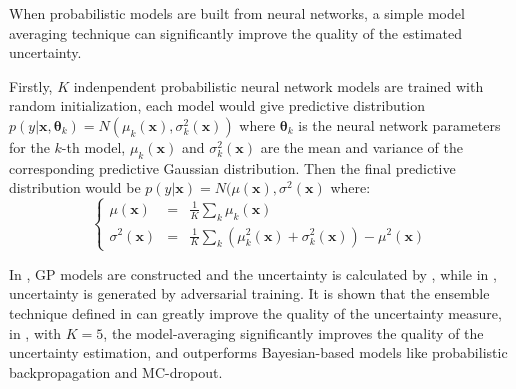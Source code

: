 When probabilistic models are built from neural networks, a simple model averaging technique\cite{lazaro2010marginalized, huang2015scalable, lakshminarayanan2017simple} can significantly improve the quality of the estimated uncertainty. 

Firstly, $K$ indenpendent probabilistic neural network models are trained with random initialization, each model would give predictive distribution $p(y | \bm{x}, \bm{\theta}_k) = N(\mu_k(\bm{x}), \sigma_k^2(\bm{x}))$ where $\bm{\theta}_k$ is the neural network parameters for the $k$-th model, $\mu_k(\bm{x})$ and $\sigma_k^2(\bm{x})$ are the mean and variance of the corresponding predictive Gaussian distribution. Then the final predictive distribution would be $p(y | \bm{x}) = N(\mu(\bm{x}), \sigma^2(\bm{x})$ where:
\begin{equation}
    \left\{
        \begin{array}{lll}
            \mu(\bm{x})      &=& \frac{1}{K} \sum_k \mu_k(\bm{x}) \\
            \sigma^2(\bm{x}) &=& \frac{1}{K} \sum_k (\mu_k^2(\bm{x}) + \sigma_k^2(\bm{x})) - \mu^2(\bm{x})
        \end{array}
    \right.
    \label{eq:deepensemble}
\end{equation}

In \cite{lazaro2010marginalized, huang2015scalable}, GP models are constructed and the uncertainty is calculated by , while in \cite{lakshminarayanan2017simple}, uncertainty is generated by adversarial training. It is shown that the ensemble technique defined in  can greatly improve the quality of the uncertainty measure, in \cite{lakshminarayanan2017simple}, with $K = 5$, the model-averaging significantly improves the quality of the uncertainty estimation, and outperforms Bayesian-based models like probabilistic backpropagation\cite{hernandez2015probabilistic} and MC-dropout\cite{gal2016dropout}.
